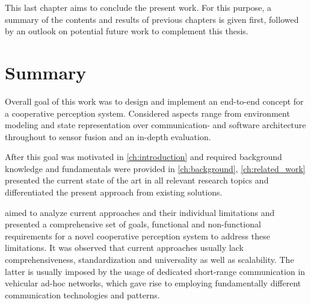 This last chapter aims to conclude the present work. For this purpose, a summary of the contents and results of previous chapters is given first, followed by an outlook on potential future work to complement this thesis.

\section{Summary}
\label{sec:conclusion:summary}
Overall goal of this work was to design and implement an end-to-end concept for a cooperative perception system. Considered aspects range from environment modeling and state representation over communication- and software architecture throughout to sensor fusion and an in-depth evaluation. 
\par
\bigskip

After this goal was motivated in \cref{ch:introduction} and required background knowledge and fundamentals were provided in \cref{ch:background}, \cref{ch:related_work} presented the current state of the art in all relevant research topics and differentiated the present approach from existing solutions. 
\par
\bigskip

 aimed to analyze current approaches and their individual limitations and presented a comprehensive set of goals, functional and non-functional requirements for a novel cooperative perception system to address these limitations. It was observed that current approaches usually lack comprehensiveness, standardization and universality as well as scalability. The latter is usually imposed by the usage of dedicated short-range communication in vehicular ad-hoc networks, which gave rise to employing fundamentally different communication technologies and patterns.
\par
\bigskip

